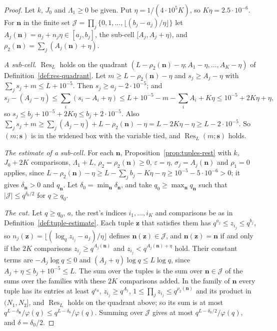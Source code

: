 \documentclass[11pt]{article}
\theoremstyle{definition}
\begin{document}
\begin{proof}
Let $k$, $J_0$ and $\Lambda_1 \ge 0$ be given. Put $\eta = 1/(4 \cdot 10^5 K)$, so $K\eta = 2.5 \cdot 10^{-6}$. For
$\mathbf n$ in the finite set $\mathcal J = \prod_j \{0, 1, \dots, \lfloor (b_j - a_j)/\eta \rfloor\}$ let
$A_j(\mathbf n) = a_j + n_j\eta \in [a_j, b_j]$, the sub-cell $[A_j, A_j + \eta)$, and $\rho_2(\mathbf n) = \sum_j
(A_j(\mathbf n) + \eta)$.

\emph{A sub-cell.} $\operatorname{Res}_L$ holds on the quadrant $(L - \rho_2(\mathbf n) - \eta; A_1 - \eta, \dots, A_K
- \eta)$ of Definition~\ref{def:res-quadrant}. Let $m \ge L - \rho_2(\mathbf n) - \eta$ and $s_j \ge A_j - \eta$ with
$\sum_j s_j + m \le L + 10^{-5}$. Then $s_j \ge a_j - 2 \cdot 10^{-5}$; and
\[
  s_j - (A_j - \eta) \le \sum_i (s_i - A_i + \eta) \le L + 10^{-5} - m - \sum_i A_i + K\eta \le 10^{-5} + 2K\eta + \eta,
\]
so $s_j \le b_j + 10^{-5} + 2K\eta \le b_j + 2 \cdot 10^{-5}$. Also $\sum_j s_j + m \ge \sum_j (A_j - \eta) + L -
\rho_2(\mathbf n) - \eta = L - 2K\eta - \eta \ge L - 2 \cdot 10^{-5}$. So $(m; \mathbf s)$ is in the widened box with
the variable tied, and $\operatorname{Res}_L(m; \mathbf s)$ holds.

\emph{The estimate of a sub-cell.} For each $\mathbf n$, Proposition~\ref{prop:tuples-rest} with $k$, $J_0 + 2K$
comparisons, $\Lambda_1 + L$, $\rho_2 = \rho_2(\mathbf n) \ge 0$, $\varepsilon = \eta$, $\sigma_j = A_j(\mathbf n)$ and
$\rho_1 = 0$ applies, since $L - \rho_2(\mathbf n) - \eta \ge L - \sum_j b_j - K\eta - \eta \ge 10^{-5} - 5 \cdot
10^{-6} > 0$; it gives $\delta_{\mathbf n} > 0$ and $q_{\mathbf n}$. Let $\delta_0 = \min_{\mathbf n} \delta_{\mathbf
n}$, and take $q_0 \ge \max_{\mathbf n} q_{\mathbf n}$ such that $|\mathcal J| \le q^{\delta_0/2}$ for $q \ge q_0$.

\emph{The cut.} Let $q \ge q_0$, $a$, the rest's indices $i_1, \dots, i_K$ and comparisons be as in
Definition~\ref{def:tuple-estimate}. Each tuple $\mathbf z$ that satisfies them has $q^{a_j} \le z_{i_j} \le q^{b_j}$,
so $n_j(\mathbf z) = \lfloor (\log_q z_{i_j} - a_j)/\eta \rfloor$ defines $\mathbf n(\mathbf z) \in \mathcal J$, and
$\mathbf n(\mathbf z) = \mathbf n$ if and only if the $2K$ comparisons $z_{i_j} \ge q^{A_j(\mathbf n)}$ and $z_{i_j} <
q^{A_j(\mathbf n) + \eta}$ hold. Their constant terms are $-A_j \log q \le 0$ and $(A_j + \eta)\log q \le L\log q$,
since $A_j + \eta \le b_j + 10^{-5} \le L$. The sum over the tuples is the sum over $\mathbf n \in \mathcal J$ of the
sums over the families with these $2K$ comparisons added. In the family of $\mathbf n$ every tuple has its entries at
least $q^{e_0}$, $z_{i_j} \ge q^{A_j}$, $1 \le \prod_j z_{i_j} \le q^{\rho_2(\mathbf n)}$ and its product in $(N_1,
N_2]$, and $\operatorname{Res}_L$ holds on the quadrant above; so its sum is at most $q^{L - \delta_{\mathbf
n}}/\varphi(q) \le q^{L - \delta_0}/\varphi(q)$. Summing over $\mathcal J$ gives at most $q^{L -
\delta_0/2}/\varphi(q)$, and $\delta = \delta_0/2$.
\end{proof}
\end{document}
